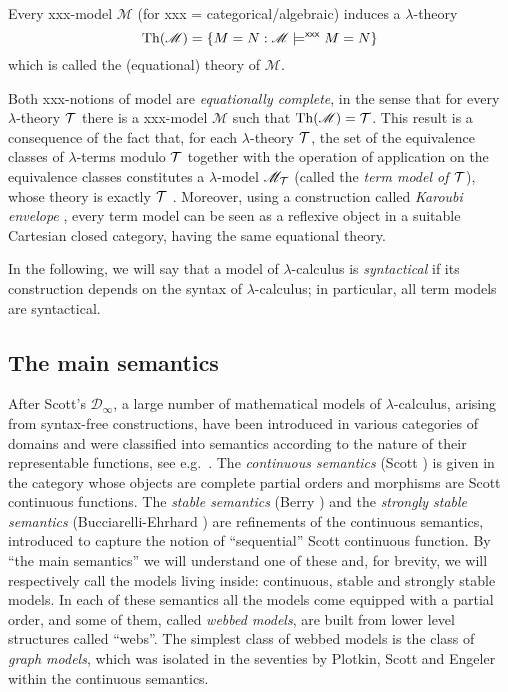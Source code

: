 \documentclass[english]{llncs}
\newcommand{\st}{:}
\newcommand{\lm}[1]{\mathscr{#1}} \newcommand{\Lint}[1]{\Lbrack #1\Rbrack} \newcommand{\ca}[1]{\mathscr{#1}} \newcommand{\Int}[1]{\vert #1\vert}
\newcommand{\ro}[1]{\mathscr{#1}} \newcommand{\App}{\mathcal{A}}
\newcommand{\cT}{{\cal T}}
\newcommand{\gl}{\lambda}
\begin{document}
Every {\sf xxx}-model $\lm{M}$ (for {\sf xxx} = categorical/algebraic) induces a $\lambda$-theory 
$$
    \Th{\lm{M}} = \{ M = N \st \lm{M}\models^{\sf xxx} M = N\}
$$
which is called the (equational) theory of $\lm{M}$.

Both {\sf xxx}-notions of model are {\em equationally complete}, in the sense that for every $\gl$-theory $\cT$ there is a {\sf xxx}-model $\lm{M}$ such that $\Th{\lm{M}} = \cT$.
This result is a consequence of the fact that, for each $\lambda$-theory $\cT$, the set of the equivalence classes of $\lambda$-terms modulo 
$\cT$ together with the operation of application on the equivalence classes constitutes a $\lambda$-model $\lm{M}_\cT$ (called the {\em term model of $\cT$}), 
whose theory is exactly $\cT$ \cite[Cor.~5.2.13(ii)]{Bare}.
Moreover, using a construction called {\em Karoubi envelope} \cite[Def.~5.5.11]{Bare}, 
every term model can be seen as a reflexive object in a suitable Cartesian closed category, having the same equational theory.

In the following, we will say that a model of $\lambda$-calculus is \emph{syntactical} if its construction depends on the syntax of $\lambda$-calculus;
in particular, all term models are syntactical.

\subsection{The main semantics}\label{subs:mainsem}

After Scott's $\ro{D}_\infty$, a large number of mathematical models of $\lambda$-calculus, arising from syntax-free constructions, have been introduced 
in various categories of domains and were classified into semantics according to the nature of their representable functions, see e.g.\ \cite{Bare,Berline00,Plotkin93}. 
The {\em continuous semantics} (Scott \cite{Scott72}) is given in the category whose objects are complete partial orders and morphisms are Scott continuous functions. 
The {\em stable semantics} (Berry \cite{Berry78}) and the {\em strongly stable semantics} (Bucciarelli-Ehrhard \cite{BucciarelliE91}) are refinements of the 
continuous semantics, introduced to capture the notion of ``sequential'' Scott continuous function.
By ``the main semantics'' we will understand one of these and, for brevity, we will respectively call the models living inside: 
continuous, stable and strongly stable models.
In each of these semantics all the models come equipped with a partial order, and some of them, called \emph{webbed models}, are built from lower level structures 
called ``webs''.
The simplest class of webbed models is the class of \emph{graph models}, which was isolated in the seventies by Plotkin, Scott and Engeler within the continuous semantics. 
\end{document}
